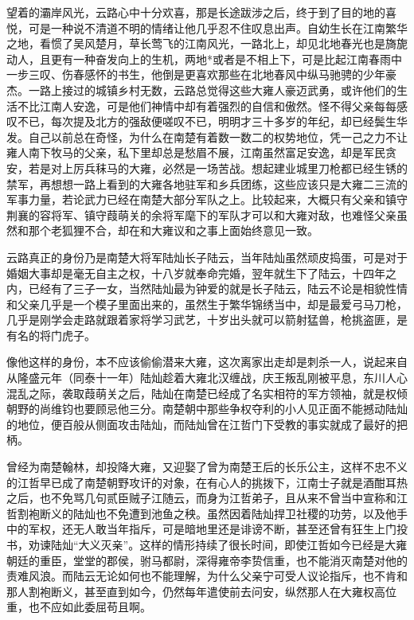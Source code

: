 望着的灞岸风光，云路心中十分欢喜，那是长途跋涉之后，终于到了目的地的喜悦，可是一种说不清道不明的情绪让他几乎忍不住叹息出声。自幼生长在江南繁华之地，看惯了吴风楚月，草长莺飞的江南风光，一路北上，却见北地春光也是旖旎动人，且更有一种奋发向上的生机，两地*或者是不相上下，可是比起江南春雨中一步三叹、伤春感怀的书生，他倒是更喜欢那些在北地春风中纵马驰骋的少年豪杰。一路上接过的城镇乡村无数，云路总觉得这些大雍人豪迈武勇，或许他们的生活不比江南人安逸，可是他们神情中却有着强烈的自信和傲然。怪不得父亲每每感叹不已，每次提及北方的强敌便嗟叹不已，明明才三十多岁的年纪，却已经鬓生华发。自己以前总在奇怪，为什么在南楚有着数一数二的权势地位，凭一己之力不让雍人南下牧马的父亲，私下里却总是愁眉不展，江南虽然富足安逸，却是军民贪安，若是对上厉兵秣马的大雍，必然是一场苦战。想起建业城里刀枪都已经生锈的禁军，再想想一路上看到的大雍各地驻军和乡兵团练，这些应该只是大雍二三流的军事力量，若论武力已经在南楚大部分军队之上。比较起来，大概只有父亲和镇守荆襄的容将军、镇守葭萌关的余将军麾下的军队才可以和大雍对敌，也难怪父亲虽然和那个老狐狸不合，却在和大雍议和之事上面始终意见一致。

云路真正的身份乃是南楚大将军陆灿长子陆云，当年陆灿虽然顽皮捣蛋，可是对于婚姻大事却是毫无自主之权，十八岁就奉命完婚，翌年就生下了陆云，十四年之内，已经有了三子一女，当然陆灿最为钟爱的就是长子陆云，陆云不论是相貌性情和父亲几乎是一个模子里面出来的，虽然生于繁华锦绣当中，却是最爱弓马刀枪，几乎是刚学会走路就跟着家将学习武艺，十岁出头就可以箭射猛兽，枪挑盗匪，是有名的将门虎子。

像他这样的身份，本不应该偷偷潜来大雍，这次离家出走却是刺杀一人，说起来自从隆盛元年（同泰十一年）陆灿趁着大雍北汉缠战，庆王叛乱刚被平息，东川人心混乱之际，袭取葭萌关之后，陆灿在南楚已经成了名实相符的军方领袖，就是权倾朝野的尚维钧也要顾忌他三分。南楚朝中那些争权夺利的小人见正面不能撼动陆灿的地位，便百般从侧面攻击陆灿，而陆灿曾在江哲门下受教的事实就成了最好的把柄。

曾经为南楚翰林，却投降大雍，又迎娶了曾为南楚王后的长乐公主，这样不忠不义的江哲早已成了南楚朝野攻讦的对象，在有心人的挑拨下，江南士子就是酒酣耳热之后，也不免骂几句贰臣贼子江随云，而身为江哲弟子，且从来不曾当中宣称和江哲割袍断义的陆灿也不免遭到池鱼之秧。虽然因着陆灿捍卫社稷的功劳，以及他手中的军权，还无人敢当年指斥，可是暗地里还是诽谤不断，甚至还曾有狂生上门投书，劝谏陆灿“大义灭亲”。这样的情形持续了很长时间，即使江哲如今已经是大雍朝廷的重臣，堂堂的郡侯，驸马都尉，深得雍帝李贽信重，也不能消灭南楚对他的责难风浪。而陆云无论如何也不能理解，为什么父亲宁可受人议论指斥，也不肯和那人割袍断义，甚至直到如今，仍然每年遣使前去问安，纵然那人在大雍权高位重，也不应如此委屈苟且啊。

